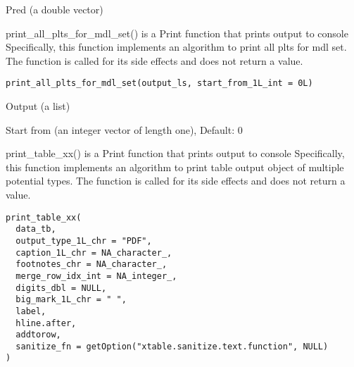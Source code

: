 \documentclass[a4paper]{book}
\begin{document}
%
\begin{Value}
Pred (a double vector)
\end{Value}
%
\begin{Description}\relax
print\_all\_plts\_for\_mdl\_set() is a Print function that prints output to console Specifically, this function implements an algorithm to print all plts for mdl set. The function is called for its side effects and does not return a value.
\end{Description}
%
\begin{Usage}
\begin{verbatim}
print_all_plts_for_mdl_set(output_ls, start_from_1L_int = 0L)
\end{verbatim}
\end{Usage}
%
\begin{Arguments}
\begin{ldescription}
\item[\code{output\_ls}] Output (a list)

\item[\code{start\_from\_1L\_int}] Start from (an integer vector of length one), Default: 0
\end{ldescription}
\end{Arguments}
%
\begin{Description}\relax
print\_table\_xx() is a Print function that prints output to console Specifically, this function implements an algorithm to print table output object of multiple potential types. The function is called for its side effects and does not return a value.
\end{Description}
%
\begin{Usage}
\begin{verbatim}
print_table_xx(
  data_tb,
  output_type_1L_chr = "PDF",
  caption_1L_chr = NA_character_,
  footnotes_chr = NA_character_,
  merge_row_idx_int = NA_integer_,
  digits_dbl = NULL,
  big_mark_1L_chr = " ",
  label,
  hline.after,
  addtorow,
  sanitize_fn = getOption("xtable.sanitize.text.function", NULL)
)
\end{verbatim}
\end{Usage}
%
\end{document}
